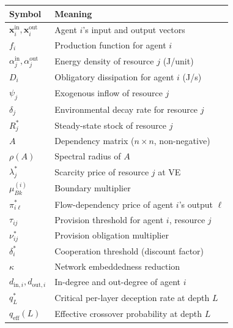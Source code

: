 \documentclass[11pt]{article}
\newcounter{none}
\begin{document}
{\def\LTcaptype{none} %
\begin{longtable}[]{@{}
  >{\raggedright\arraybackslash}p{}
  >{\raggedright\arraybackslash}p{}@{}}
\toprule\noalign{}
\begin{minipage}[b]{\linewidth}\raggedright
Symbol
\end{minipage} & \begin{minipage}[b]{\linewidth}\raggedright
Meaning
\end{minipage} \\
\midrule\noalign{}
\endhead
\bottomrule\noalign{}
\endlastfoot
\(\mathbf{x}_i^{\mathrm{in}}, \mathbf{x}_i^{\mathrm{out}}\) & Agent
\(i\)'s input and output vectors \\
\(f_i\) & Production function for agent \(i\) \\
\(\alpha_j^{\mathrm{in}}, \alpha_j^{\mathrm{out}}\) & Energy density of
resource \(j\) (J/unit) \\
\(D_i\) & Obligatory dissipation for agent \(i\) (J/s) \\
\(\psi_j\) & Exogenous inflow of resource \(j\) \\
\(\delta_j\) & Environmental decay rate for resource \(j\) \\
\(R_j^*\) & Steady-state stock of resource \(j\) \\
\(A\) & Dependency matrix (\(n \times n\), non-negative) \\
\(\rho(A)\) & Spectral radius of \(A\) \\
\(\lambda_j^*\) & Scarcity price of resource \(j\) at VE \\
\(\mu_{Bk}^{(i)}\) & Boundary multiplier \\
\(\pi_{i\ell}^*\) & Flow-dependency price of agent \(i\)'s output
\(\ell\) \\
\(\tau_{ij}\) & Provision threshold for agent \(i\), resource \(j\) \\
\(\nu_{ij}^*\) & Provision obligation multiplier \\
\(\delta_i^*\) & Cooperation threshold (discount factor) \\
\(\kappa\) & Network embeddedness reduction \\
\(d_{\mathrm{in},i}, d_{\mathrm{out},i}\) & In-degree and out-degree of
agent \(i\) \\
\(q_L^*\) & Critical per-layer deception rate at depth \(L\) \\
\(q_{\mathrm{eff}}(L)\) & Effective crossover probability at depth
\(L\) \\
\end{longtable}
}
\end{document}
